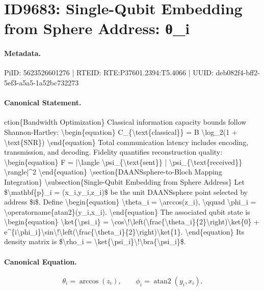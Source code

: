 \section*{ID9683: Single-Qubit Embedding from Sphere Address: θ\_i}
\paragraph{Metadata.}
PiID: 5623526601276 | RTEID: RTE:P37601.2394:T5.4066 | UUID: deb082f4-bff2-5ef3-a5a5-1a52bc732273

\paragraph{Canonical Statement.}
ction\{Bandwidth Optimization\} Classical information capacity bounds follow Shannon-Hartley: \textbackslash{}begin\{equation\} C\_\{\textbackslash{}text\{classical\}\} = B \textbackslash{}log\_2(1 + \textbackslash{}text\{SNR\}) \textbackslash{}end\{equation\} Total communication latency includes encoding, transmission, and decoding. Fidelity quantifies reconstruction quality: \textbackslash{}begin\{equation\} F = |\textbackslash{}langle \textbackslash{}psi\_\{\textbackslash{}text\{sent\}\} | \textbackslash{}psi\_\{\textbackslash{}text\{received\}\} \textbackslash{}rangle|\textasciicircum{}2 \textbackslash{}end\{equation\} \textbackslash{}section\{DAANSsphere-to-Bloch Mapping Integration\} \textbackslash{}subsection\{Single-Qubit Embedding from Sphere Address\} Let \$\textbackslash{}mathbf\{p\}\_i = (x\_i,y\_i,z\_i)\$ be the unit DAANSsphere point selected by address \$i\$. Define \textbackslash{}begin\{equation\} \textbackslash{}theta\_i = \textbackslash{}arccos(z\_i), \textbackslash{}qquad \textbackslash{}phi\_i = \textbackslash{}operatorname\{atan2\}(y\_i,x\_i). \textbackslash{}end\{equation\} The associated qubit state is \textbackslash{}begin\{equation\} \textbackslash{}ket\{\textbackslash{}psi\_i\} = \textbackslash{}cos\textbackslash{}!\textbackslash{}left(\textbackslash{}frac\{\textbackslash{}theta\_i\}\{2\}\textbackslash{}right)\textbackslash{}ket\{0\} + e\textasciicircum{}\{i\textbackslash{}phi\_i\}\textbackslash{}sin\textbackslash{}!\textbackslash{}left(\textbackslash{}frac\{\textbackslash{}theta\_i\}\{2\}\textbackslash{}right)\textbackslash{}ket\{1\}. \textbackslash{}end\{equation\} Its density matrix is \$\textbackslash{}rho\_i = \textbackslash{}ket\{\textbackslash{}psi\_i\}\textbackslash{}!\textbackslash{}bra\{\textbackslash{}psi\_i\}\$.

\paragraph{Canonical Equation.}
\[
\theta_i = \arccos(z_i), \qquad \phi_i = \operatorname{atan2}(y_i,x_i).
\]

